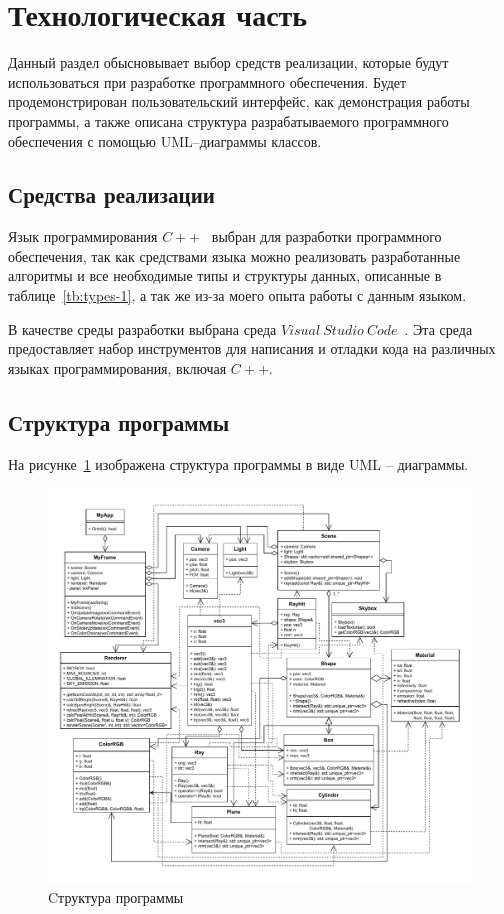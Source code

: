 \section{Технологическая часть}

Данный раздел обысновывает выбор средств реализации, которые будут использоваться при разработке программного обеспечения. Будет продемонстрирован пользовательский интерфейс, как демонстрация работы программы, а также описана структура разрабатываемого программного обеспечения с помощью UML--диаграммы классов.

\subsection{Средства реализации}

Язык программирования $C++$~\cite{ISO14882_2020} выбран для разработки программного обеспечения, так как средствами языка можно реализовать разработанные алгоритмы и все необходимые типы и структуры данных, описанные в таблице~\ref{tb:types-1}, а так же из-за моего опыта работы с данным языком.

В качестве среды разработки выбрана среда $Visual~Studio~Code$~\cite{vscode}. Эта среда предоставляет набор инструментов для написания и отладки кода на различных языках программирования, включая $C++$.

\subsection{Структура программы}

На рисунке~\ref{uml} изображена структура программы в виде UML -- диаграммы.

\begin{figure}[ht!]
	\begin{center}
		\includegraphics[scale=0.74]{diag/main-UML.pdf}
	\end{center}
	\caption{Cтруктура программы}
	\label{uml}
\end{figure}

